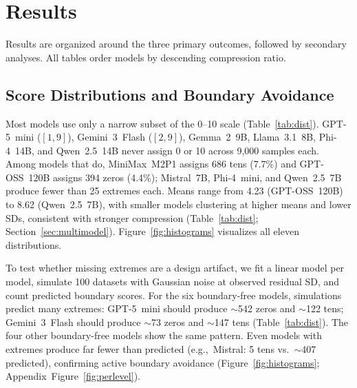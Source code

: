 \documentclass[11pt]{article}
\newcommand{\eg}{e.g.,\ }
\begin{document}
\section{Results}
\label{sec:results}

Results are organized around the three primary outcomes, followed by
secondary analyses. All tables order models by descending compression
ratio.

\subsection{Score Distributions and Boundary Avoidance}

Most models use only a narrow subset of the 0--10 scale
(Table~\ref{tab:dist}). GPT-5~mini ($[1,9]$), Gemini~3~Flash ($[2,9]$),
Gemma~2~9B, Llama~3.1~8B, Phi-4~14B, and Qwen~2.5~14B never assign 0
or 10 across 9{,}000 samples each. Among models that do, MiniMax~M2P1
assigns 686 tens (7.7\%) and GPT-OSS~120B assigns 394 zeros (4.4\%);
Mistral~7B, Phi-4~mini, and Qwen~2.5~7B produce fewer than 25 extremes
each. Means range from 4.23 (GPT-OSS~120B) to 8.62 (Qwen~2.5~7B), with
smaller models clustering at higher means and lower SDs, consistent with
stronger compression (Table~\ref{tab:dist}; Section~\ref{sec:multimodel}).
Figure~\ref{fig:histograms} visualizes all eleven distributions.

To test whether missing extremes are a design artifact, we fit a linear
model per model, simulate 100 datasets with Gaussian noise at observed
residual SD, and count predicted boundary scores. For the six
boundary-free models, simulations predict many extremes: GPT-5~mini
should produce $\sim$542 zeros and $\sim$122 tens; Gemini~3~Flash should
produce $\sim$73 zeros and $\sim$147 tens (Table~\ref{tab:dist}). The
four other boundary-free models show the same pattern. Even models with
extremes produce far fewer than predicted (\eg Mistral: 5 tens vs.~$\sim$407 predicted), confirming active boundary avoidance
(Figure~\ref{fig:histograms}; Appendix~Figure~\ref{fig:perlevel}).
\end{document}

